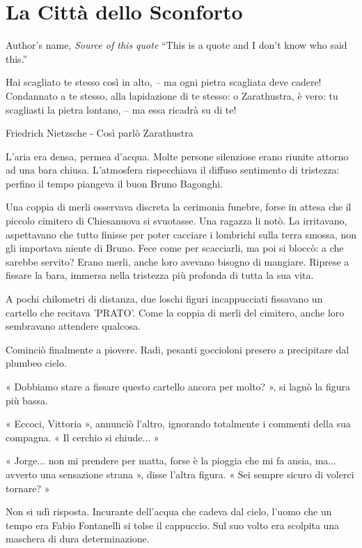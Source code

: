 \chapter{La Città dello Sconforto}

\begin{chapquote}{Author's name, \textit{Source of this quote}}
``This is a quote and I don't know who said this.''
\end{chapquote}


Hai scagliato te stesso così in alto, – ma ogni pietra scagliata deve cadere! Condannato a te stesso, alla lapidazione di te stesso: o Zarathustra, è vero: tu scagliasti la pietra lontano, – ma essa ricadrà su di te!

Friedrich Nietzsche - Così parlò Zarathustra


L'aria era densa, permea d'acqua. Molte persone silenziose erano riunite attorno ad una bara chiusa. L'atmosfera rispecchiava il diffuso sentimento di tristezza: perfino il tempo piangeva il buon Bruno Bagonghi.

Una coppia di merli osservava discreta la cerimonia funebre, forse in attesa che il piccolo cimitero di Chiesanuova si svuotasse. Una ragazza li notò. La irritavano, aspettavano che tutto finisse per poter cacciare i lombrichi sulla terra smossa, non gli importava niente di Bruno. Fece come per scacciarli, ma poi si bloccò: a che sarebbe servito? Erano merli, anche loro avevano bisogno di mangiare. Riprese a fissare la bara, immersa nella tristezza più profonda di tutta la sua vita.

A pochi chilometri di distanza, due loschi figuri incappucciati fissavano un cartello che recitava 'PRATO'. Come la coppia di merli del cimitero, anche loro sembravano attendere qualcosa.

Cominciò finalmente a piovere. Radi, pesanti goccioloni presero a precipitare dal plumbeo cielo.

« Dobbiamo stare a fissare questo cartello ancora per molto? », si lagnò la figura più bassa.

« Eccoci, Vittoria », annunciò l'altro, ignorando totalmente i commenti della sua compagna. « Il cerchio si chiude... »

« Jorge... non mi prendere per matta, forse è la pioggia che mi fa ansia, ma... avverto una sensazione strana », disse l'altra figura. « Sei sempre sicuro di volerci tornare? »

Non si udì risposta. Incurante dell'acqua che cadeva dal cielo, l'uomo che un tempo era Fabio Fontanelli si tolse il cappuccio. Sul suo volto era scolpita una maschera di dura determinazione.

